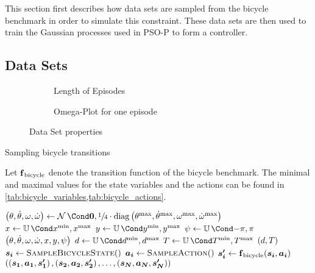 This section first describes how data sets are sampled from the bicycle benchmark in order to simulate this constraint.
These data sets are then used to train the Gaussian processes used in PSO-P to form a controller.

\subsection{Data Sets}
\begin{figure}[tp]
    \centering
    \begin{subfigure}{\subfigurewidth}
        \caption{Length of Episodes}
        \label{fig:data_set_properties:episode_length}
    \end{subfigure}
    \begin{subfigure}{\subfigurewidth}
        \caption{Omega-Plot for one episode}
        \label{fig:data_set_properties:omega_example}
    \end{subfigure}
    \caption{Data Set properties}
    \label{fig:data_set_properties}
\end{figure}
\begin{algorithm}[tp]
    \caption{Sampling bicycle transitions}
    \label{alg:bicycle_transitions}
    Let $\DynBicycle$ denote the transition function of the bicycle benchmark.
    The minimal and maximal values for the state variables and the actions can be found in \cref{tab:bicycle_variables,tab:bicycle_actions}.
    \begin{algorithmic}[1]
            \State $\left( \theta, \dot{\theta}, \omega, \dot{\omega} \right) \gets \Gaussian{\mat{0}, \sfrac{1}{4} \cdot \diag \left( \theta^{\text{max}}, \dot{\theta}^{\text{max}}, \omega^{\text{max}}, \dot{\omega}^{\text{max}} \right)}$
            \State $x \gets \Uniform{x^{\text{min}}, x^{\text{max}}}$
            \State $y \gets \Uniform{y^{\text{min}}, y^{\text{max}}}$
            \State $\psi \gets \Uniform{-\pi, \pi}$
            \State \Return $\Bicycle*{\theta, \dot{\theta}, \omega, \dot{\omega}, x, y, \psi}$
        \EndFunction
        \Statex
            \State $d \gets \Uniform{d^{\text{min}}, d^{\text{max}}}$
            \State $T \gets \Uniform{T^{\text{min}}, T^{\text{max}}}$
            \State \Return $\Bicycle{d, T}$
        \EndFunction
        \Statex
                \State $\mat{s_i} \gets \Call{SampleBicycleState}$
                \State $\mat{a_i} \gets \Call{SampleAction}$
                \State $\mat{s^\prime_{i}} \gets \DynBicycle(\mat{s_i}, \mat{a_i})$
            \EndFor
            \State \Return $\left( \left( \mat{s_1}, \mat{a_1}, \mat{s^\prime_1} \right), \left( \mat{s_2}, \mat{a_2}, \mat{s^\prime_2} \right), \dots, \left( \mat{s_{N}}, \mat{a_{N}}, \mat{s^\prime_{N}} \right) \right)$
        \EndFunction
    \end{algorithmic}
\end{algorithm}
